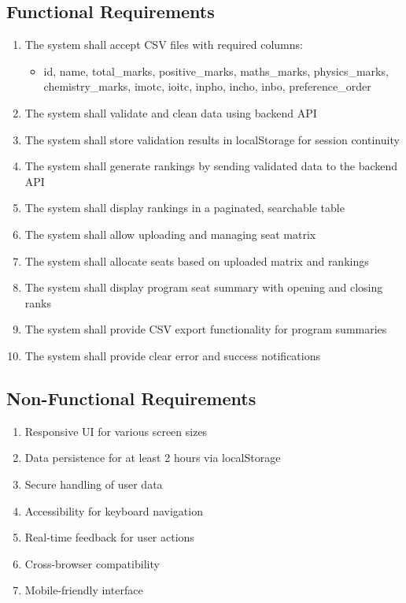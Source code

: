 \documentclass[12pt,a4paper]{article}
\begin{document}
\subsection{Functional Requirements}
\begin{enumerate}[label=FR\arabic*.]
    \item The system shall accept CSV files with required columns:
    \begin{itemize}
        \item id, name, total\_marks, positive\_marks, maths\_marks, physics\_marks, chemistry\_marks, imotc, ioitc, inpho, incho, inbo, preference\_order
    \end{itemize}
    \item The system shall validate and clean data using backend API
    \item The system shall store validation results in localStorage for session continuity
    \item The system shall generate rankings by sending validated data to the backend API
    \item The system shall display rankings in a paginated, searchable table
    \item The system shall allow uploading and managing seat matrix
    \item The system shall allocate seats based on uploaded matrix and rankings
    \item The system shall display program seat summary with opening and closing ranks
    \item The system shall provide CSV export functionality for program summaries
    \item The system shall provide clear error and success notifications
\end{enumerate}

\subsection{Non-Functional Requirements}
\begin{enumerate}[label=NFR\arabic*.]
    \item Responsive UI for various screen sizes
    \item Data persistence for at least 2 hours via localStorage
    \item Secure handling of user data
    \item Accessibility for keyboard navigation
    \item Real-time feedback for user actions
    \item Cross-browser compatibility
    \item Mobile-friendly interface
\end{enumerate}
\end{document}
